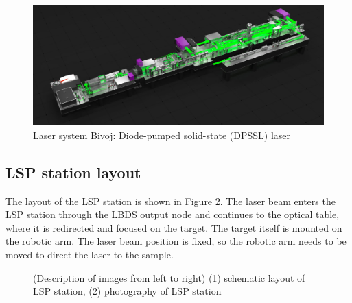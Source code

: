  \begin{figure}[h]
    \centering
    \includegraphics[width=1.0\linewidth]{img/bivoj.jpg}
    \caption[Laser system Bivoj: Diode-pumped solid-state (DPSSL) laser]{Laser system Bivoj: Diode-pumped solid-state (DPSSL) laser \protect\cite{bivojiso}}
    \label{fig:bivoj}
\end{figure}
 
 \subsection{LSP station layout}
 \label{sec:lsp_layout}

The layout of the LSP station is shown in Figure \ref{fig:lsplayout}. The laser beam enters the LSP station through the LBDS output node and
continues to the optical table, where it is redirected and
focused on the target. The target itself is mounted on the
robotic arm. The laser beam position is fixed, so the robotic
arm needs to be moved to direct the laser to the sample.

\begin{figure}[H]
\begin{center}
  \hspace{1cm}
  \caption[Schematic layout of LSP station and photography of LSP station]
    {(Description of images from left to right) (1) schematic layout of LSP station, (2) photography of LSP station \cite{bohm_kaufman_brajer_rostohar_2019}}
  \label{fig:lsplayout}
\end{center}
\end{figure}




